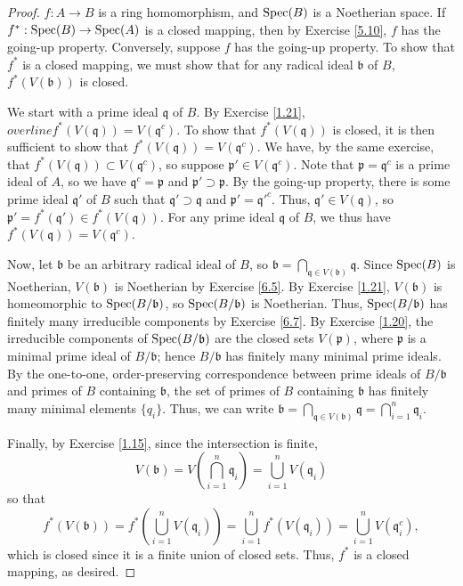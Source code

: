 \begin{proof}
$f : A \to B$ is a ring homomorphism, and $\operatorname{Spec}(B)$ is a Noetherian space. If $f^* : \operatorname{Spec}(B) \to \operatorname{Spec}(A)$ is a closed mapping, then by
Exercise \ref{5.10}, $f$ has the going-up property. Conversely, suppose $f$ has the going-up property. To show that $f^*$ is a closed mapping, 
we must show that for any radical ideal $\mathfrak{b}$ of $B$, $f^*(V(\mathfrak{b}))$ is closed. 

We start with a prime ideal $\mathfrak{q}$ of $B$. By Exercise \ref{1.21}, $overline{f^*(V(\mathfrak{q}))} = V(\mathfrak{q}^c)$.
To show that $f^*(V(\mathfrak{q}))$ is closed, it is then sufficient to show that $f^*(V(\mathfrak{q})) = V(\mathfrak{q}^c)$. We have, by
the same exercise, that $f^*(V(\mathfrak{q})) \subset V(\mathfrak{q}^c)$, so suppose $\mathfrak{p}' \in V(\mathfrak{q}^c)$. Note that 
$\mathfrak{p} = \mathfrak{q}^c$ is a prime ideal of $A$, so we have $\mathfrak{q}^c = \mathfrak{p}$ and $\mathfrak{p}' \supset \mathfrak{p}$. 
By the going-up property, there is some prime ideal $\mathfrak{q}'$ of $B$ such that $\mathfrak{q}' \supset \mathfrak{q}$ and 
$\mathfrak{p}' = \mathfrak{q}'^c$. Thus, $\mathfrak{q}' \in V(\mathfrak{q})$, so $\mathfrak{p}' = f^*(\mathfrak{q}') \in f^*(V(\mathfrak{q}))$. 
For any prime ideal $\mathfrak{q}$ of $B$, we thus have $f^*(V(\mathfrak{q})) = V(\mathfrak{q}^c)$.

Now, let $\mathfrak{b}$ be an arbitrary radical ideal of $B$, so $\mathfrak{b} = \bigcap_{\mathfrak{q} \in V(\mathfrak{b})}\mathfrak{q}$. Since $\operatorname{Spec}(B)$
is Noetherian, $V(\mathfrak{b})$ is Noetherian by Exercise \ref{6.5}. By Exercise \ref{1.21}, $V(\mathfrak{b})$ is homeomorphic to $\operatorname{Spec}(B/\mathfrak{b})$,
so $\operatorname{Spec}(B/\mathfrak{b})$ is Noetherian. Thus, $\operatorname{Spec}(B/\mathfrak{b})$ has finitely many irreducible components by Exercise \ref{6.7}. 
By Exercise \ref{1.20}, the irreducible components of $\operatorname{Spec}(B/\mathfrak{b})$ are the closed sets $V(\mathfrak{p})$, where $\mathfrak{p}$ is a 
minimal prime ideal of $B/\mathfrak{b}$; hence $B/\mathfrak{b}$ has finitely many minimal prime ideals. By the one-to-one, order-preserving correspondence
between prime ideals of $B/\mathfrak{b}$ and primes of $B$ containing $\mathfrak{b}$, the set of primes of $B$ containing $\mathfrak{b}$ has finitely
many minimal elements $\{q_i\}$. Thus, we can write $\mathfrak{b} = \bigcap_{\mathfrak{q} \in V(\mathfrak{b})}\mathfrak{q} = \bigcap_{i=1}^n\mathfrak{q}_i$.

Finally, by Exercise \ref{1.15}, since the intersection is finite,
$$V(\mathfrak{b}) = V\left(\bigcap_{i=1}^n\mathfrak{q}_i\right) = \bigcup_{i=1}^n V(\mathfrak{q}_i)$$
so that
$$f^*(V(\mathfrak{b})) = f^*\left(\bigcup_{i=1}^n V(\mathfrak{q}_i)\right) = \bigcup_{i=1}^nf^*\left(V(\mathfrak{q}_i)\right) 
= \bigcup_{i=1}^n V(\mathfrak{q}_i^c),$$
which is closed since it is a finite union of closed sets. Thus, $f^*$ is a closed mapping, as desired.
\end{proof}

